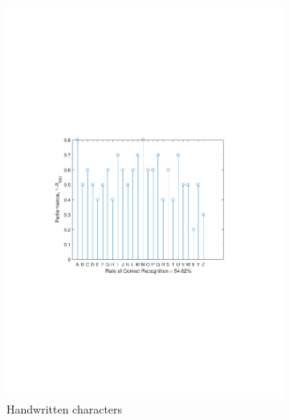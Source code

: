 \documentclass[journal,a4paper,onecolumn,11pt]{IEEEtran}
\begin{document}
\begin{figure}[!h]
\begin{subfigure}{.5\textwidth}
		\includegraphics[clip, trim=0cm .25cm 0cm .4cm, width=\textwidth]{performance_hwchar_sm.pdf}
		\caption{Handwritten characters}
		\label{fig:performance_hwchar_sm}
	\end{subfigure}%
	\begin{subfigure}{.5\textwidth}
		\centering

\end{subfigure}
\end{figure}
\end{document}
